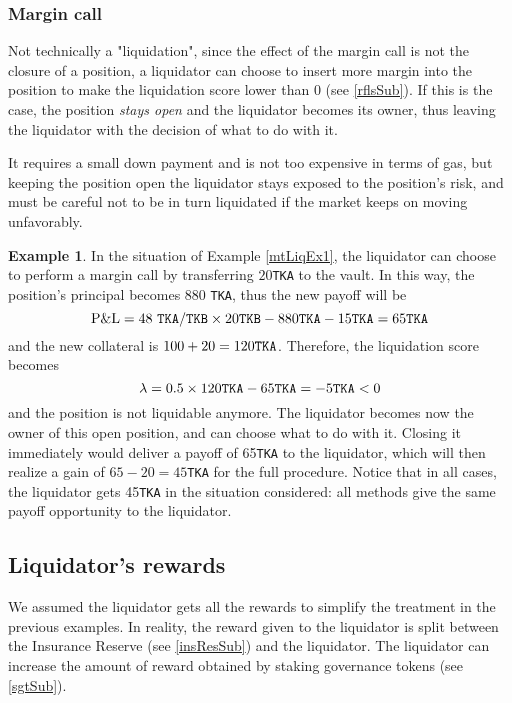 \documentclass[a4paper,10 pt]{article}
\theoremstyle{definition}
\newtheorem{example}{Example}
\begin{document}
\subsubsection{Margin call}\label{mcSubSub}
Not technically a "liquidation", since the effect of the margin call is not the closure of a position, a liquidator can choose to insert more margin into the position to make the liquidation score lower than $0$ (see \ref{rflsSub}). If this is the case, the position {\it stays open} and the liquidator becomes its owner, thus leaving the liquidator with the decision of what to do with it.

It requires a small down payment and is not too expensive in terms of gas, but keeping the position open the liquidator stays exposed to the position's risk, and must be careful not to be in turn liquidated if the market keeps on moving unfavorably.

\begin{example}\label{mtLiqEx3}
In the situation of Example \ref{mtLiqEx1}, the liquidator can choose to perform a margin call by transferring $20$\verb|TKA| to the vault. In this way, the position's principal becomes $880$ \verb|TKA|, thus the new payoff will be $$\text{P\&L} =  48\ \verb|TKA|/\verb|TKB| \times 20  \verb|TKB| -  880 \verb|TKA| - 15\verb|TKA|= 65  \verb|TKA| $$
and the new collateral is $100 + 20 = 120 \verb|TKA|$. Therefore, the liquidation score becomes $$\lambda = 0.5\times 120\verb|TKA| - 65\verb|TKA| = -5\verb|TKA| < 0 $$
and the position is not liquidable anymore. The liquidator becomes now the owner of this open position, and can choose what to do with it. Closing it immediately would deliver a payoff of 65\verb|TKA| to the liquidator, which will then realize a gain of $65-20 = 45$\verb|TKA| for the full procedure. Notice that in all cases, the liquidator gets 45\verb|TKA| in the situation considered: all methods give the same payoff opportunity to the liquidator.
\end{example}

\subsection{Liquidator's rewards}\label{liqrewSub}

 We assumed the liquidator gets all the rewards to simplify the treatment in the previous examples. In reality, the reward given to the liquidator is split between the Insurance Reserve (see \ref{insResSub}) and the liquidator. The liquidator can increase the amount of reward obtained by staking governance tokens (see \ref{sgtSub}).
\end{document}
